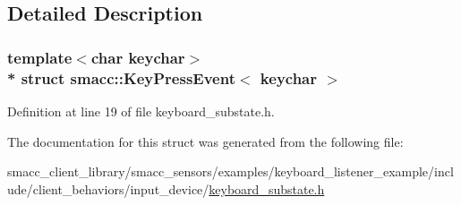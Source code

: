 \subsection{Detailed Description}
\subsubsection*{template$<$char keychar$>$\\*
struct smacc\+::\+Key\+Press\+Event$<$ keychar $>$}



Definition at line 19 of file keyboard\+\_\+substate.\+h.



The documentation for this struct was generated from the following file\+:\begin{DoxyCompactItemize}
\item 
smacc\+\_\+client\+\_\+library/smacc\+\_\+sensors/examples/keyboard\+\_\+listener\+\_\+example/include/client\+\_\+behaviors/input\+\_\+device/\hyperlink{keyboard__substate_8h}{keyboard\+\_\+substate.\+h}\end{DoxyCompactItemize}
